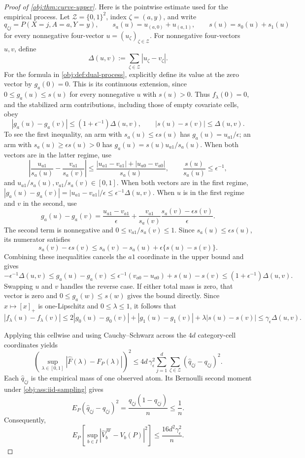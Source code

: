 \documentclass[11pt]{article}
\begin{document}
\begin{proof}[Proof of \cref{obj:thm:curve-upper}]
Here is the pointwise estimate used for the empirical process. Let \(\mathcal Z=\{0,1\}^2\), index \(\zeta=(a,y)\), and write
\[
q_{\zeta j}=P(X=j,A=a,Y=y),\qquad
s_a(u)=u_{(a,0)}+u_{(a,1)},\qquad
s(u)=s_0(u)+s_1(u)
\]
for every nonnegative four-vector \(u=(u_\zeta)_{\zeta\in\mathcal Z}\). For nonnegative four-vectors \(u,v\), define
\[
\Delta(u,v):=\sum_{\zeta\in\mathcal Z}|u_\zeta-v_\zeta|.
\]
For the formula in \cref{obj:def:dual-process}, explicitly define its value at the zero vector by \(g_a(0)=0\). This is its continuous extension, since \(0\le g_a(u)\le s(u)\) for every nonnegative \(u\) with \(s(u)>0\). Thus \(f_\lambda(0)=0\), and the stabilized arm contributions, including those of empty covariate cells, obey
\[
|g_a(u)-g_a(v)|\le(1+\epsilon^{-1})\Delta(u,v),
\qquad
|s(u)-s(v)|\le\Delta(u,v).
\]
To see the first inequality, an arm with \(s_a(u)\le\epsilon s(u)\) has \(g_a(u)=u_{a1}/\epsilon\); an arm with \(s_a(u)\ge\epsilon s(u)>0\) has \(g_a(u)=s(u)u_{a1}/s_a(u)\). When both vectors are in the latter regime, use
\[
\left|\frac{u_{a1}}{s_a(u)}-\frac{v_{a1}}{s_a(v)}\right|
\le
\frac{|u_{a1}-v_{a1}|+|u_{a0}-v_{a0}|}{s_a(u)},
\qquad
\frac{s(u)}{s_a(u)}\le\epsilon^{-1},
\]
and \(u_{a1}/s_a(u),v_{a1}/s_a(v)\in[0,1]\). When both vectors are in the first regime, \(|g_a(u)-g_a(v)|=|u_{a1}-v_{a1}|/\epsilon\le\epsilon^{-1}\Delta(u,v)\). When \(u\) is in the first regime and \(v\) in the second, use
\[
g_a(u)-g_a(v)
=
\frac{u_{a1}-v_{a1}}{\epsilon}
+
\frac{v_{a1}}{s_a(v)}
 \frac{s_a(v)-\epsilon s(v)}{\epsilon}.
\]
The second term is nonnegative and \(0\le v_{a1}/s_a(v)\le1\). Since \(s_a(u)\le\epsilon s(u)\), its numerator satisfies
\[
s_a(v)-\epsilon s(v)
\le s_a(v)-s_a(u)+\epsilon\{s(u)-s(v)\}.
\]
Combining these inequalities cancels the \(a1\) coordinate in the upper bound and gives
\[
-\epsilon^{-1}\Delta(u,v)
\le g_a(u)-g_a(v)
\le \epsilon^{-1}(v_{a0}-u_{a0})+s(u)-s(v)
\le(1+\epsilon^{-1})\Delta(u,v).
\]
Swapping \(u\) and \(v\) handles the reverse case. If either total mass is zero, that vector is zero and \(0\le g_a(w)\le s(w)\) gives the bound directly. Since \(x\mapsto[x]_+\) is one-Lipschitz and \(0\le\lambda\le1\), it follows that
\[
|f_\lambda(u)-f_\lambda(v)|
\le
2|g_0(u)-g_0(v)|+|g_1(u)-g_1(v)|
 +\lambda|s(u)-s(v)|
\le\gamma_\epsilon\Delta(u,v).
\]

Applying this cellwise and using Cauchy--Schwarz across the \(4d\) category-cell coordinates yields
\[
\left(\sup_{\lambda\in[0,1]}
 |\widehat F(\lambda)-F_P(\lambda)|\right)^2
\le
4d\,\gamma_\epsilon^2
\sum_{j=1}^d\sum_{\zeta\in\mathcal Z}
 (\widehat q_{\zeta j}-q_{\zeta j})^2.
\]
Each \(\widehat q_{\zeta j}\) is the empirical mass of one observed atom. Its Bernoulli second moment under \cref{obj:ass:iid-sampling} gives
\[
E_P(\widehat q_{\zeta j}-q_{\zeta j})^2
=\frac{q_{\zeta j}(1-q_{\zeta j})}{n}\le\frac1n.
\]
Consequently,
\[
E_P\!\left[\sup_{b\in I}
 |\widehat V_b^{\mathrm{JF}}-V_b(P)|^2\right]
\le
\frac{16d^2\gamma_\epsilon^2}{n}.
\]


\end{proof}
\end{document}
